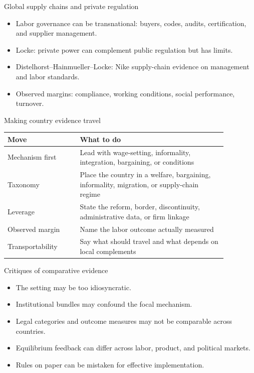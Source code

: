 \documentclass[aspectratio=169,11pt]{beamer}
\begin{document}
\begin{frame}{Global supply chains and private regulation}
\begin{itemize}
    \item Labor governance can be transnational: buyers, codes, audits, certification, and supplier management.
    \item Locke: private power can complement public regulation but has limits.
    \item Distelhorst--Hainmueller--Locke: Nike supply-chain evidence on management and labor standards.
    \item Observed margins: compliance, working conditions, social performance, turnover.
\end{itemize}
\end{frame}

\begin{frame}{Making country evidence travel}
\small
\begin{tabular}{p{0.29\linewidth} p{0.58\linewidth}}
\toprule
Move & What to do \\
\midrule
Mechanism first & Lead with wage-setting, informality, integration, bargaining, or conditions \\
Taxonomy & Place the country in a welfare, bargaining, informality, migration, or supply-chain regime \\
Leverage & State the reform, border, discontinuity, administrative data, or firm linkage \\
Observed margin & Name the labor outcome actually measured \\
Transportability & Say what should travel and what depends on local complements \\
\bottomrule
\end{tabular}
\end{frame}

\begin{frame}{Critiques of comparative evidence}
\begin{itemize}
    \item The setting may be too idiosyncratic.
    \item Institutional bundles may confound the focal mechanism.
    \item Legal categories and outcome measures may not be comparable across countries.
    \item Equilibrium feedback can differ across labor, product, and political markets.
    \item Rules on paper can be mistaken for effective implementation.
\end{itemize}
\end{frame}
\end{document}
